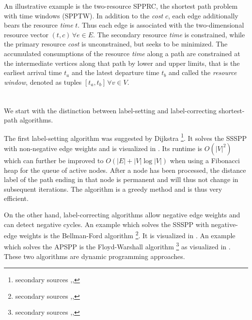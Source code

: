 \begin{definition}[SPPTW]
An illustrative example is the two-resource SPPRC, the shortest path problem with time windows (SPPTW). In addition to the \textit{cost} $c$, each edge additionally bears the resource \textit{time} $t$. Thus each edge is associated with the two-dimensional resource vector $(t,c) \, \forall e \in E$. The secondary resource \textit{time} is constrained, while the primary resource \textit{cost} is unconstrained, but seeks to be minimized. The accumulated consumptions of the resource \textit{time} along a path are constrained at the intermediate vertices along that path by lower and upper limits, that is the earliest arrival time $t_a$ and the latest departure time $t_b$ and called the \textit{resource window}, denoted as tuples $[t_a,t_b] \, \forall v \in V$.
\end{definition}



\section{}
We start with the distinction between label-setting \cite[ch. 4]{ahuja1993network} and label-correcting \cite[ch. 5]{ahuja1993network} shortest-path algorithms.

The first label-setting algorithm was suggested by Dijkstra \cite{dijkstra1959note}\footnote{secondary sources \cite[sec. 4.5]{ahuja1993network},\cite[sec. 24.3]{cormen2009introduction},\cite[sec. 3.7, p. 83]{jungnickel2013graphs}}. It solves the SSSPP with non-negative edge weights and is visualized in \cite{velden2014idp}. Its runtime is $O(|V|^2)$ which can further be improved to $O(|E| + |V| \log |V|)$ when using a Fibonacci heap for the queue of active nodes. After a node has been processed, the distance label of the path ending in that node is permanent and will thus not change in subsequent iterations. The algorithm is a greedy method and is thus very efficient.

On the other hand, label-correcting algorithms allow negative edge weights and can detect negative cycles. An example which solves the SSSPP with negative-edge weights is the Bellman-Ford algorithm \cite{bellman1958routing,ford1962flows}\footnote{secondary sources \cite[sec. 5.4]{ahuja1993network},\cite[sec. 24.1]{cormen2009introduction},\cite[sec. 3.7, p. 87]{jungnickel2013graphs}}. It is visualized in \cite{storz2013idp}. An example which solves the APSPP is the Floyd-Warshall algorithm \cite{floyd1962algorithm,warshall1962theorem}\footnote{secondary sources \cite[sec. 5.6]{ahuja1993network},\cite[sec. 25.2]{cormen2009introduction},\cite[sec. 3.9]{jungnickel2013graphs}} as visualized in \cite{becker2015idp}. These two algorithms are dynamic programming approaches.


